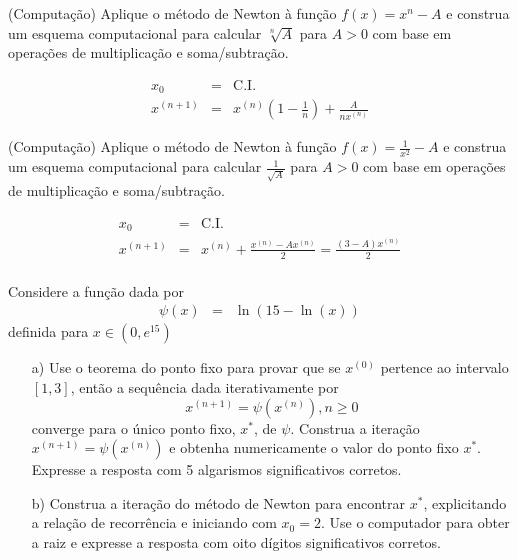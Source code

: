 \begin{ex}
\begin{exer}(Computação) Aplique o método de Newton à função $f(x)=x^n-A$ e construa um esquema computacional para calcular  $\sqrt[n]{A}$ para $A>0$ com base em operações de multiplicação e soma/subtração.
\end{exer}
\begin{resp}
 \begin{eqnarray}
 x_{0} &=& \text{C.I.}\\
 x^{(n+1)}&=&x^{(n)}\left(1-\frac{1}{n}\right) + \frac{A}{n x^{(n)}}
 \end{eqnarray}

\end{resp}


\begin{exer}(Computação) Aplique o método de Newton à função $f(x)=\frac{1}{x^2}-A$ e construa um esquema computacional para calcular  $\frac{1}{\sqrt{A}}$ para $A>0$ com base em operações de multiplicação e soma/subtração.
\end{exer}
\begin{resp}
 \begin{eqnarray}
 x_{0} &=& \text{C.I.}\\
 x^{(n+1)}&=&x^{(n)} + \frac{x^{(n)}-Ax^{(n)}}{2}=\frac{(3-A)x^{(n)}}{2}\\
 \end{eqnarray}

\end{resp}




\begin{exer} Considere a função dada por
\begin{eqnarray}
\psi(x)&=&\ln\left(15-\ln(x)\right)
\end{eqnarray}
definida para $x\in \left(0,e^{15}\right)$
\begin{itemize}
\item [a)] Use o teorema do ponto fixo para provar que se $x^{(0)}$ pertence ao intervalo $[1,3]$, então a sequência dada iterativamente por \begin{equation} x^{(n+1)}=\psi(x^{(n)}),n\geq 0 \end{equation} converge para o único ponto fixo, $x^*$, de $\psi$. Construa a iteração $x^{(n+1)}=\psi(x^{(n)})$ e obtenha numericamente o valor do ponto fixo $x^*$. Expresse a resposta com 5 algarismos significativos corretos.
\item [b)] Construa a iteração do método de Newton para encontrar $x^*$, explicitando a relação de recorrência e iniciando com $x_0=2$. Use o computador para obter a raiz e expresse a resposta com oito dígitos significativos corretos.
\end{itemize}
\end{exer}


\end{ex}
